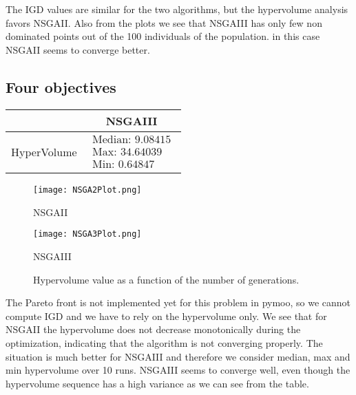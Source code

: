 \documentclass[a4paper,11pt]{article}
\numberwithin{equation}{section}
\begin{document}
\noindent The IGD values are similar for the two algorithms, but the hypervolume analysis favors NSGAII. Also from the plots we see that NSGAIII has only few non dominated points out of the 100 individuals of the population. in this case NSGAII seems to converge better.

\newpage

\subsection{Four objectives}

\begin{table}[!h]
\begin{center}
\begin{tabular}{|c|c|}
\hline
 & NSGAIII \\
\hline
HyperVolume &$\begin{array}{l}
\text{Median: 9.08415}\\
\text{Max: 34.64039}\\
\text{Min: 0.64847}\end{array}$\\
\hline
\end{tabular}
\end{center}
\end{table}

\begin{figure}[h]
        \centering
        \begin{minipage}{0.48\textwidth} 
            \centering
            \texttt{[image: NSGA2Plot.png]} 
            \caption*{NSGAII}
        \end{minipage}
        \hfill
        \begin{minipage}{0.48\textwidth} 
            \centering
            \texttt{[image: NSGA3Plot.png]} 
            \caption*{NSGAIII} 
        \end{minipage}
        \caption{Hypervolume value as a function of the number of generations. } 
    \end{figure}

\noindent The Pareto front is not implemented yet for this problem in pymoo, so we cannot compute IGD and we have to rely on the hypervolume only. We see that for NSGAII the hypervolume does not decrease monotonically during the optimization, indicating that the algorithm is not converging properly. The situation is much better for NSGAIII and therefore we consider median, max and min hypervolume over 10 runs. NSGAIII seems to converge well, even though the hypervolume sequence has a high variance as we can see from the table.
\end{document}
